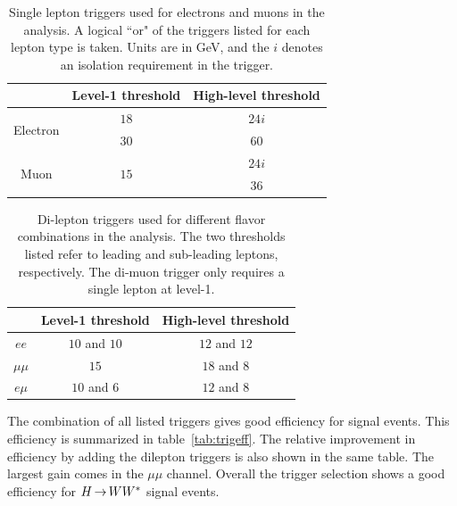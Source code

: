 \begin{table}[h!]
\centering
\captionsetup{justification=centering}

\hspace{-10pt}
\begin{tabular}{|c|c|c|}
\hline
 & Level-1 threshold & High-level threshold \\ \hline \hline
\multirow{2}{*}{Electron} & $18$ & $24i$ \\ 
 & $30$ & $60$ \\ \hline

\multirow{2}{*}{Muon} & \multirow{2}{*}{$15$} & $24i$ \\ 
& & $36$ \\ 
 \hline

\end{tabular}

\caption{
Single lepton triggers used for electrons and muons in the \HWWfull analysis. A logical ``or" of the triggers listed for each lepton type is taken. Units are in GeV, and the $i$ denotes an isolation requirement in the trigger. 
}
\label{tab:single-lepton-trig}
\end{table}

\begin{table}[h!]
\centering
\captionsetup{justification=centering}

\hspace{-10pt}
\begin{tabular}{|c|c|c|}
\hline
 & Level-1 threshold & High-level threshold \\ \hline \hline
$ee$ & $10$ and $10$ & $12$ and $12$ \\ \hline
$\mu\mu$ & $15$ & $18$ and $8$ \\ \hline
$e\mu$ & $10$ and $6$ & $12$ and $8$ \\ \hline
\end{tabular}

\caption{
Di-lepton triggers used for different flavor combinations in the \HWWfull analysis. The two thresholds listed refer to leading and sub-leading leptons, respectively. The di-muon trigger only requires a single lepton at level-1. 
}
\label{tab:dilepton-trig}
\end{table}

The combination of all listed triggers gives good efficiency for signal events. This efficiency is summarized in table~\ref{tab:trigeff}. The relative improvement in efficiency by adding the dilepton triggers is also shown in the same table. The largest gain comes in the $\mu\mu$ channel. Overall the trigger selection shows a good efficiency for $H{\,{\rightarrow}\,}WW^\ast$ signal events.

